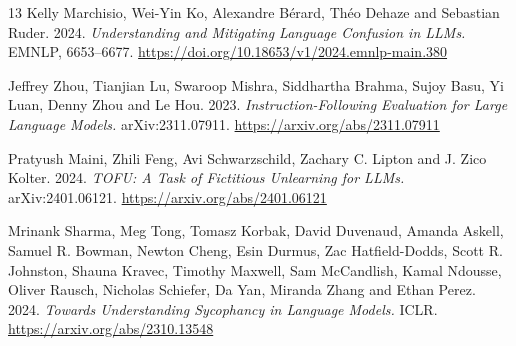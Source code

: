 \begin{thebibliography}{13}
Kelly Marchisio, Wei-Yin Ko, Alexandre Bérard, Théo Dehaze and Sebastian Ruder. 2024.
\emph{Understanding and Mitigating Language Confusion in LLMs.}
EMNLP, 6653--6677. \url{https://doi.org/10.18653/v1/2024.emnlp-main.380}

Jeffrey Zhou, Tianjian Lu, Swaroop Mishra, Siddhartha Brahma, Sujoy Basu,
Yi Luan, Denny Zhou and Le Hou. 2023.
\emph{Instruction-Following Evaluation for Large Language Models.}
arXiv:2311.07911. \url{https://arxiv.org/abs/2311.07911}

Pratyush Maini, Zhili Feng, Avi Schwarzschild, Zachary C. Lipton and J. Zico Kolter. 2024.
\emph{TOFU: A Task of Fictitious Unlearning for LLMs.}
arXiv:2401.06121. \url{https://arxiv.org/abs/2401.06121}

Mrinank Sharma, Meg Tong, Tomasz Korbak, David Duvenaud, Amanda Askell,
Samuel R. Bowman, Newton Cheng, Esin Durmus, Zac Hatfield-Dodds,
Scott R. Johnston, Shauna Kravec, Timothy Maxwell, Sam McCandlish,
Kamal Ndousse, Oliver Rausch, Nicholas Schiefer, Da Yan, Miranda Zhang and Ethan Perez. 2024.
\emph{Towards Understanding Sycophancy in Language Models.}
ICLR. \url{https://arxiv.org/abs/2310.13548}

\end{thebibliography}
